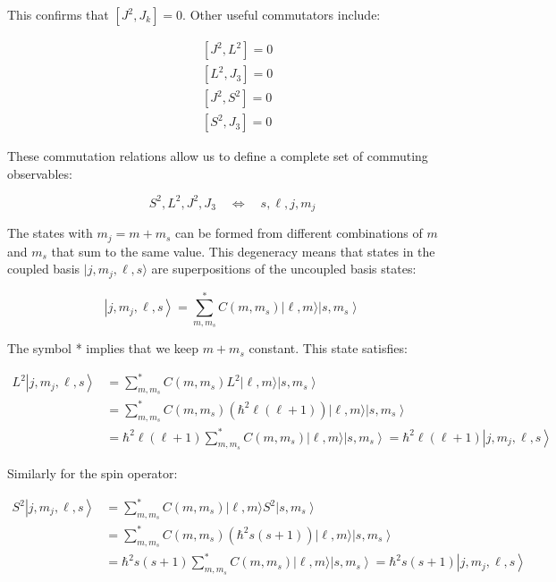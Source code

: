 This confirms that $\left[J^{2}, J_{k}\right]=0$. Other useful commutators include:

\begin{align}
&\left[J^{2}, L^{2}\right]=0 \\
&\left[L^{2}, J_{3}\right]=0  \\
&\left[J^{2}, S^{2}\right]=0 \\
&\left[S^{2}, J_{3}\right]=0
\end{align}

These commutation relations allow us to define a complete set of commuting observables:

\begin{equation}
S^{2}, L^{2}, J^{2}, J_{3} \quad \Longleftrightarrow \quad s, \ell, j, m_{j}
\end{equation}

The states with $m_j = m + m_s$ can be formed from different combinations of $m$ and $m_s$ that sum to the same value. This degeneracy means that states in the coupled basis $|j, m_j, \ell, s\rangle$ are superpositions of the uncoupled basis states:

\begin{equation}
\left|j, m_{j}, \ell, s\right\rangle=\sum_{m, m_{s}}^{*} C\left(m, m_{s}\right)|\ell, m\rangle\left|s, m_{s}\right\rangle
\end{equation}


The symbol * implies that we keep $m+m_{s}$ constant. This state satisfies:

\begin{align}
L^{2}\left|j, m_{j}, \ell, s\right\rangle &= \sum_{m, m_{s}}^{*} C\left(m, m_{s}\right) L^{2}|\ell, m\rangle\left|s, m_{s}\right\rangle \\
&= \sum_{m, m_{s}}^{*} C\left(m, m_{s}\right)\left(\hbar^{2} \ell(\ell+1)\right)|\ell, m\rangle\left|s, m_{s}\right\rangle \\
&= \hbar^{2} \ell(\ell+1) \sum_{m, m_{s}}^{*} C\left(m, m_{s}\right)|\ell, m\rangle\left|s, m_{s}\right\rangle=\hbar^{2} \ell(\ell+1)\left|j, m_{j}, \ell, s\right\rangle
\end{align}

Similarly for the spin operator:

\begin{align}
S^{2}\left|j, m_{j}, \ell, s\right\rangle &= \sum_{m, m_{s}}^{*} C\left(m, m_{s}\right)|\ell, m\rangle S^{2}\left|s, m_{s}\right\rangle \\
&= \sum_{m, m_{s}}^{*} C\left(m, m_{s}\right)\left(\hbar^{2} s(s+1)\right)|\ell, m\rangle\left|s, m_{s}\right\rangle \\
&= \hbar^{2} s(s+1) \sum_{m, m_{s}}^{*} C\left(m, m_{s}\right)|\ell, m\rangle\left|s, m_{s}\right\rangle=\hbar^{2} s(s+1)\left|j, m_{j}, \ell, s\right\rangle
\end{align}

